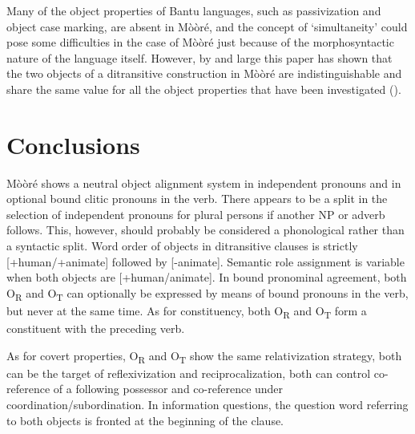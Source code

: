 \documentclass[output=paper]{langsci/langscibook}
\begin{document}
Many of the object properties of Bantu languages, such as passivization and object case marking, are absent in Mòòré, and the concept of `simultaneity' could pose some difficulties in the case of Mòòré just because of the morphosyntactic nature of the language itself. However, by and large this paper has shown that the two objects of a ditransitive construction in Mòòré are indistinguishable and share the same value for all the object properties that have been investigated ().  

\section{Conclusions}\label{§7:conclusions.pacchiarotti}

Mòòré shows a neutral object alignment system in independent pronouns and in optional bound clitic pronouns in the verb. There appears to be a split in the selection of independent pronouns for plural persons if another NP or adverb follows. This, however, should probably be considered a phonological rather than a syntactic split. Word order of objects in ditransitive clauses is strictly [+human/+animate] followed by [-animate]. Semantic role assignment is variable when both objects are [+human/animate]. In bound pronominal agreement, both O\textsubscript{R} and O\textsubscript{T} can optionally be expressed by means of bound pronouns in the verb, but never at the same time. As for constituency, both O\textsubscript{R} and O\textsubscript{T} form a constituent with the preceding verb. 

As for covert properties, O\textsubscript{R} and O\textsubscript{T} show the same relativization strategy, both can be the target of reflexivization and reciprocalization, both can control co-reference of a following possessor and co-reference under coordination/subordination. In information questions, the question word referring to both objects is fronted at the beginning of the clause. 
\end{document}
